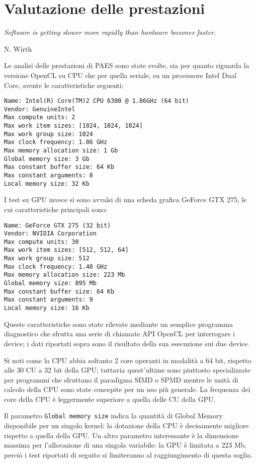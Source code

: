 \documentclass[12pt,a4paper,oneside]{book}
\begin{document}
\chapter{Valutazione delle prestazioni}
\linespread{1}
\epigraph{\textit{Software is getting slower more rapidly than hardware becomes faster.}}{N. Wirth}
\linespread{1.3}

Le analisi delle prestazioni di PAES sono state svolte, sia per quanto riguarda la versione \ac{OpenCL} su \ac{CPU} che per quella seriale, su un processore Intel Dual Core, avente le caratteristiche seguenti:
\begin{verbatim}
Name: Intel(R) Core(TM)2 CPU 6300 @ 1.86GHz (64 bit)
Vendor: GenuineIntel
Max compute units: 2
Max work item sizes: [1024, 1024, 1024]
Max work group size: 1024
Max clock frequency: 1.86 GHz
Max memory allocation size: 1 Gb
Global memory size: 3 Gb
Max constant buffer size: 64 Kb
Max constant arguments: 8
Local memory size: 32 Kb
\end{verbatim}

I test su \ac{GPU} invece si sono avvalsi di una scheda grafica GeForce GTX 275, le cui caratteristiche principali sono:
\begin{verbatim}
Name: GeForce GTX 275 (32 bit)
Vendor: NVIDIA Corporation
Max compute units: 30
Max work item sizes: [512, 512, 64]
Max work group size: 512
Max clock frequency: 1.40 GHz
Max memory allocation size: 223 Mb
Global memory size: 895 Mb
Max constant buffer size: 64 Kb
Max constant arguments: 9
Local memory size: 16 Kb
\end{verbatim}

Queste caratteristiche sono state rilevate mediante un semplice programma diagnostico che sfrutta una serie di chiamate \ac{API} \ac{OpenCL} per interrogare i device; i dati riportati sopra sono il risultato della sua esecuzione sui due device.

Si noti come la \ac{CPU} abbia soltanto 2 core operanti in modalità a 64 bit, rispetto alle 30 \ac{CU} a 32 bit della \ac{GPU}; tuttavia quest'ultime sono piuttosto specializzate per programmi che sfruttano il paradigma \ac{SIMD} o \ac{SPMD} mentre le unità di calcolo della \ac{CPU} sono state concepite per un uso più generale. La frequenza dei core della \ac{CPU} è leggermente superiore a quella delle \ac{CU} della \ac{GPU}.

Il parametro \verb|Global memory size| indica la quantità di Global Memory disponibile per un singolo kernel:  la dotazione della \ac{CPU} è decisamente migliore rispetto a quella della \ac{GPU}. Un altro parametro interessante è la dimensione massima per l'allocazione di una singola variabile: la \ac{GPU} è limitata a 223 Mb, perciò i test riportati di seguito si limiteranno al raggiungimento di questa soglia.
\end{document}
